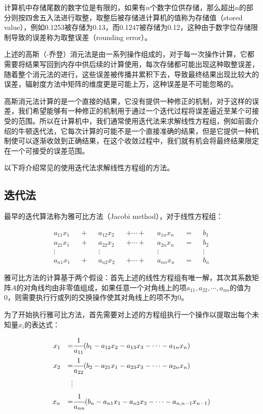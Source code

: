 计算机中存储尾数的数字位是有限的，如果有$n$个数字位供存储，那么超出$n$的部分则按四舍五入法进行取整，取整后被存储进计算机的值称为存储值（stored value），例如0.1253被存储为0.13，而0.1247被存储为0.12，这种由于数字位存储限制导致的误差称为取整误差（rounding error）。

上述的高斯（-乔登）消元法是由一系列操作组成的，对于每一次操作计算，它都需要将结果写回到内存中供后续的计算使用，每次存储都可能出现这种取整误差，随着整个消元法的进行，这些误差被传播并累积下去，导致最终结果出现比较大的误差，辐射度方法中矩阵的维度更是可能上万，这种误差是不可能忽略的。

高斯消元法计算的是一个直接的结果，它没有提供一种修正的机制，对于这样的误差，我们希望能够有一种修正的机制用于通过一个迭代过程将误差逼近至某个可接受的范围。所以在计算机中，我们通常使用迭代法来求解线性方程组，例如前面介绍的牛顿迭代法，它每次计算的可能不是一个直接准确的结果，但是它提供一种机制使可以逐渐收敛到正确结果，在这个收敛过程中，我们就有机会将最终结果限定在一个可接受的误差范围。

以下将介绍常见的使用迭代法求解线性方程组的方法。




\subsection{迭代法}\label{sec:r-iteration}
最早的迭代算法称为雅可比方法（Jacobi method），对于线性方程组：

\begin{equation}
\begin{aligned}
	a_{11}x_1  &&+&&  a_{12}x_2 && +\cdots + && a_{1n}x_n &&=&& b_1\\
	a_{21}x_1  &&+&&  a_{22}x_2 && +\cdots + && a_{2n}x_n &&=&& b_2\\
	\vdots     && &&  \vdots    &&           && \vdots    && && \vdots\\
	a_{n1}x_1  &&+&&  a_{n2}x_2 && +\cdots + && a_{nn}x_n &&=&& b_n
\end{aligned}
\end{equation}

\noindent 雅可比方法的计算基于两个假设：首先上述的线性方程组有唯一解，其次其系数矩阵$A$的对角线均由非零值组成，如果任意一个对角线上的项$a_{11},a_{22},\cdots,a_{nn}$的值为0，则需要执行行或列的交换操作使其对角线上的项不为0。

为了开始执行雅可比方法，首先需要对上述的方程组执行一个操作以提取出每个未知量$x_i$的表达式：

\begin{equation}\label{e:r-jacobi-approximation}
\begin{aligned}
	x_1 && =     &  \cfrac{1}{a_{11}}(b_1-a_{12}x_2-a_{13}x_3-\cdots -a_{1n}x_n)\\
	x_2 && =     &  \cfrac{1}{a_{22}}(b_2-a_{21}x_1-a_{23}x_3-\cdots -a_{2n}x_n)\\
	    &&\vdots &\\
	x_n && =     &  \cfrac{1}{a_{nn}}(b_n-a_{n1}x_1-a_{n2}x_3-\cdots -a_{n,n-1}x_{n-1})\\
\end{aligned}
\end{equation}

